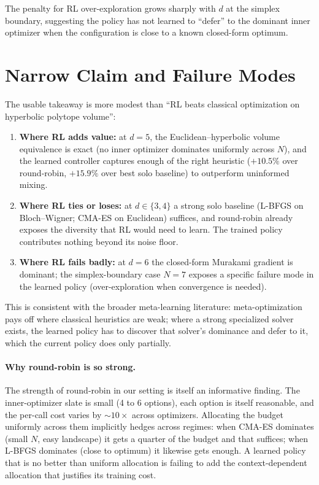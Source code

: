 \documentclass[11pt]{article}
\begin{document}
The penalty for RL over-exploration grows sharply with $d$ at the
simplex boundary, suggesting the policy has not learned to
``defer'' to the dominant inner optimizer when the configuration
is close to a known closed-form optimum.

\section{Narrow Claim and Failure Modes}

The usable takeaway is more modest than ``RL beats classical
optimization on hyperbolic polytope volume'':

\begin{enumerate}
\item \textbf{Where RL adds value:} at $d = 5$, the
      Euclidean--hyperbolic volume equivalence is exact (no inner
      optimizer dominates uniformly across $N$), and the learned
      controller captures enough of the right heuristic
      ($+10.5\%$ over round-robin, $+15.9\%$ over best solo
      baseline) to outperform uninformed mixing.

\item \textbf{Where RL ties or loses:} at $d \in \{3, 4\}$ a
      strong solo baseline (L-BFGS on Bloch--Wigner; CMA-ES on
      Euclidean) suffices, and round-robin already exposes the
      diversity that RL would need to learn.  The trained policy
      contributes nothing beyond its noise floor.

\item \textbf{Where RL fails badly:} at $d = 6$ the closed-form
      Murakami gradient is dominant; the simplex-boundary case
      $N = 7$ exposes a specific failure mode in the learned
      policy (over-exploration when convergence is needed).
\end{enumerate}

This is consistent with the broader meta-learning literature:
meta-optimization pays off where classical heuristics are weak;
where a strong specialized solver exists, the learned policy
has to discover that solver's dominance and defer to it, which
the current policy does only partially.

\paragraph{Why round-robin is so strong.}
The strength of round-robin in our setting is itself an
informative finding.  The inner-optimizer slate is small (4 to 6
options), each option is itself reasonable, and the per-call cost
varies by $\sim 10\times$ across optimizers.  Allocating the
budget uniformly across them implicitly hedges across regimes:
when CMA-ES dominates (small $N$, easy landscape) it gets a
quarter of the budget and that suffices; when L-BFGS dominates
(close to optimum) it likewise gets enough.  A learned policy
that is no better than uniform allocation is failing to add the
context-dependent allocation that justifies its training cost.
\end{document}
